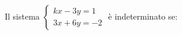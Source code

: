 Il sistema $\left\{\begin{matrix}\mathit{kx}-3y=1\\3x+6y=-2\end{matrix}\right.$ è indeterminato se: 
